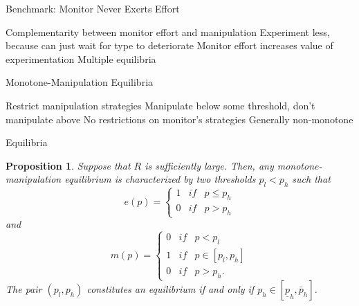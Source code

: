 \documentclass[usenames,dvipsnames]{beamer}
\newcommand{\bo}{\begin{outline}}
\newcommand{\eo}{\end{outline}}
\newtheorem{proposition}{Proposition}
\begin{document}
\begin{frame}{Benchmark: Monitor Never Exerts Effort}
\begin{center}
        
        
        
\end{center}
\bo
\1      Complementarity between monitor effort and manipulation
\2 Experiment less, because can just wait for type to deteriorate
\1 Monitor effort increases value of experimentation
\1      Multiple equilibria 
\eo
\end{frame}

\begin{frame}{Monotone-Manipulation Equilibria}
\bo
\1 Restrict manipulation strategies
\1 Manipulate below some threshold, don't manipulate above
\1 No restrictions on monitor's strategies
\2 Generally non-monotone
\eo
\end{frame}

\begin{frame}{Equilibria}\label{frame:Prop1}
\begin{proposition}
        \label{prop:MPE-Characterization}Suppose that $R$ is sufficiently large. Then, any monotone-manipulation equilibrium is characterized by two thresholds $%
        p_{l}<p_{h}$ such that%
        \[
        e\left( p\right) =\left\{ 
        \begin{array}{ccc}
        1 & if & p\leq p_{h} \\ 
        0 & if & p>p_{h}%
        \end{array}%
        \right. 
        \]%
        and%
        \[
        m\left( p\right) =\left\{ 
        \begin{array}{ccc}
        0 & if & p<p_{l} \\ 
        1 & if & p\in \left[ p_{l},p_{h}\right] \\ 
        0 & if & p>p_{h}.%
        \end{array}%
        \right. 
        \]%
        The pair $\left(
        p_{l},p_{h}\right) $ constitutes an equilibrium if and only if $p_{h}\in %
        \left[ \underline{p}_h,\bar{p}_h\right]$.     
\end{proposition}
\hfill \hyperlink{frame:ValueFunctions}{} \quad \hyperlink{frame:OtherEq}{}
\end{frame}
\end{document}
